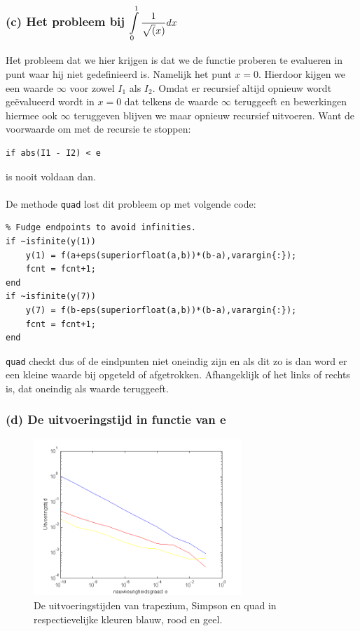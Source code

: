 \documentclass[11pt,a4paper]{article}
\begin{document}
\subsubsection*{(c) Het probleem bij $\mathop{\mathlarger{\int\limits_{0}^1\frac{1}{\sqrt(x)}dx}}$}
Het probleem dat we hier krijgen is dat we de functie proberen te evalueren in punt waar hij niet gedefinieerd is. Namelijk het punt $x=0$. Hierdoor kijgen we een waarde $\infty$ voor zowel $I_1$ als $I_2$. Omdat er recursief altijd opnieuw wordt ge\"evalueerd wordt in $x=0$ dat telkens de waarde $\infty$ teruggeeft en bewerkingen hiermee ook $\infty$ teruggeven blijven we maar opnieuw recursief uitvoeren. Want de voorwaarde om met de recursie te stoppen: 
\begin{verbatim}
if abs(I1 - I2) < e
\end{verbatim}
is nooit voldaan dan.
\\
\\
De methode \verb|quad| lost dit probleem op met volgende code:
\begin{verbatim}
% Fudge endpoints to avoid infinities.
if ~isfinite(y(1))
    y(1) = f(a+eps(superiorfloat(a,b))*(b-a),varargin{:});
    fcnt = fcnt+1;
end
if ~isfinite(y(7))
    y(7) = f(b-eps(superiorfloat(a,b))*(b-a),varargin{:});
    fcnt = fcnt+1;
end
\end{verbatim}
\verb|quad| checkt dus of de eindpunten niet oneindig zijn en als dit zo is dan word er een kleine waarde bij opgeteld of afgetrokken. Afhangeklijk of het links of rechts is, dat oneindig als waarde teruggeeft.
\subsubsection*{(d) De uitvoeringstijd in functie van e }

\begin{figure}[H]
	\centering
	\includegraphics[width=0.7\textwidth]{12d1.png}
	\caption*{De uitvoeringstijden van trapezium, Simpson en quad in respectievelijke kleuren blauw, rood en geel.}
	\end{figure}
\end{document}
